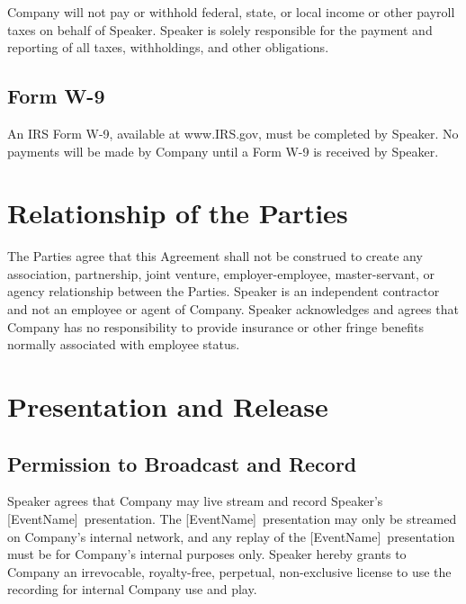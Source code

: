 \documentclass[a4paper,12pt]{article} %
\newcommand{\EventName}{[EventName]}
\begin{document}
Company will not pay or withhold federal, state, or local income or other payroll taxes on behalf of Speaker. Speaker is solely responsible for the payment and reporting of all taxes, withholdings, and other obligations.

\subsection{Form W-9}

An IRS Form W-9, available at www.IRS.gov, must be completed by Speaker. No payments will be made by Company until a Form W-9 is received by Speaker.


\section{Relationship of the Parties}

The Parties agree that this Agreement shall not be construed to create any association, partnership, joint venture, employer-employee, master-servant, or agency relationship between the Parties. Speaker is an independent contractor and not an employee or agent of Company. Speaker acknowledges and agrees that Company has no responsibility to provide insurance or other fringe benefits normally associated with employee status.


\section{Presentation and Release}

\subsection{Permission to Broadcast and Record}

Speaker agrees that Company may live stream and record Speaker's \EventName ~presentation. The \EventName ~presentation may only be streamed on Company's internal network, and any replay of the \EventName ~presentation must be for Company's internal purposes only. Speaker hereby grants to Company an irrevocable, royalty-free, perpetual, non-exclusive license to use the recording for internal Company use and play.
\end{document}
